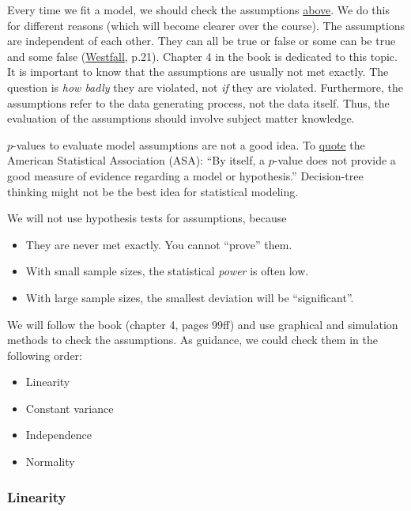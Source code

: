 \documentclass[
]{book}
\providecommand{\tightlist}{%
  \setlength{\itemsep}{0pt}\setlength{\parskip}{0pt}}
\begin{document}
Every time we fit a model, we should check the assumptions \hyperref[_model_assumptions]{above}.
We do this for different reasons (which will become clearer over the course).
The assumptions are independent of each other.
They can all be true or false or some can be true and some false
(\href{https://www.routledge.com/Understanding-Regression-Analysis-A-Conditional-Distribution-Approach/Westfall-Arias/p/book/9780367493516?srsltid=AfmBOore3O_Ciecl0TTkr9AjPIY1d6OmbQa7o7IAdKpTSkD8s9HkwzD4}{Westfall}, p.21).
Chapter 4 in the book is dedicated to this topic. It is important to know
that the assumptions are usually not met exactly. The question is \emph{how badly} they are violated,
not \emph{if} they are violated.
Furthermore, the assumptions refer to the data generating process, not the data itself.
Thus, the evaluation of the assumptions should involve subject matter knowledge.

\(p\)-values to evaluate model assumptions are not a good idea. To \href{https://www.tandfonline.com/doi/full/10.1080/00031305.2016.1154108\#d1e949}{quote} the
American Statistical Association (ASA): ``By itself, a \(p\)-value does not provide a good measure
of evidence regarding a model or hypothesis.''
Decision-tree thinking might not be the best idea for statistical modeling.

We will not use hypothesis tests for assumptions, because

\begin{itemize}
\tightlist
\item
  They are never met exactly. You cannot ``prove'' them.
\item
  With small sample sizes, the statistical \emph{power} is often low.
\item
  With large sample sizes, the smallest deviation will be ``significant''.
\end{itemize}

We will follow the book (chapter 4, pages 99ff) and use graphical and simulation methods to check the assumptions.
As guidance, we could check them in the following order:

\begin{itemize}
\tightlist
\item
  Linearity
\item
  Constant variance
\item
  Independence
\item
  Normality
\end{itemize}

\subsubsection{Linearity}\label{linearity}
\end{document}
